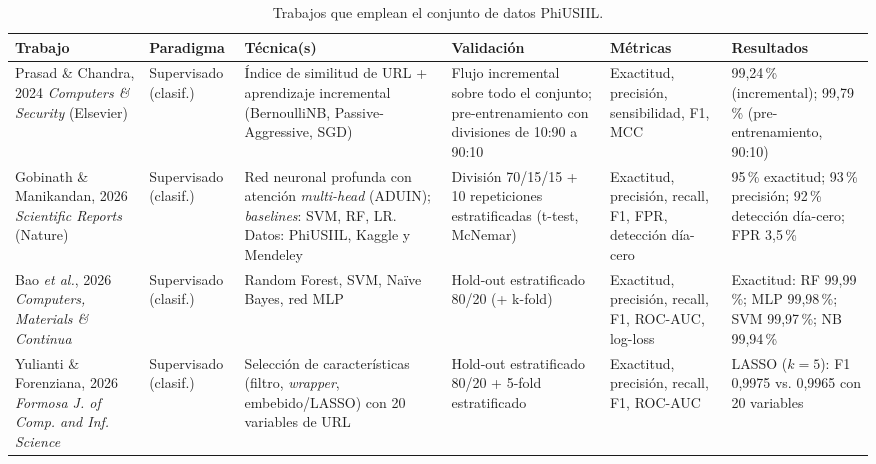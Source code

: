 \documentclass[journal]{IEEEtran}
\begin{document}
\begin{table}[t]
\centering
\caption{Trabajos que emplean el conjunto de datos PhiUSIIL.}
\label{tab:sota}
\small
\begin{tabular}{p{2.6cm} p{1.6cm} p{3.0cm} p{2.6cm} p{2.4cm} p{2.6cm}}
\toprule
\textbf{Trabajo} & \textbf{Paradigma} & \textbf{Técnica(s)} & \textbf{Validación} & \textbf{Métricas} & \textbf{Resultados} \\
\midrule
Prasad \& Chandra, 2024 \cite{prasad2024} \newline \textit{Computers \& Security} (Elsevier) &
Supervisado (clasif.) &
Índice de similitud de URL + aprendizaje incremental (BernoulliNB, Passive-Aggressive, SGD) &
Flujo incremental sobre todo el conjunto; pre-entrenamiento con divisiones de 10:90 a 90:10 &
Exactitud, precisión, sensibilidad, F1, MCC &
99,24\,\% (incremental); 99,79\,\% (pre-entrenamiento, 90:10) \\
\addlinespace
Gobinath \& Manikandan, 2026 \cite{gobinath2026} \newline \textit{Scientific Reports} (Nature) &
Supervisado (clasif.) &
Red neuronal profunda con atención \textit{multi-head} (ADUIN); \textit{baselines}: SVM, RF, LR. Datos: PhiUSIIL, Kaggle y Mendeley &
División 70/15/15 + 10 repeticiones estratificadas (t-test, McNemar) &
Exactitud, precisión, recall, F1, FPR, detección día-cero &
95\,\% exactitud; 93\,\% precisión; 92\,\% detección día-cero; FPR 3,5\,\% \\
\addlinespace
Bao \textit{et al.}, 2026 \cite{bao2026} \newline \textit{Computers, Materials \& Continua} &
Supervisado (clasif.) &
Random Forest, SVM, Naïve Bayes, red MLP &
Hold-out estratificado 80/20 (+ k-fold) &
Exactitud, precisión, recall, F1, ROC-AUC, log-loss &
Exactitud: RF 99,99\,\%; MLP 99,98\,\%; SVM 99,97\,\%; NB 99,94\,\% \\
\addlinespace
Yulianti \& Forenziana, 2026 \cite{yulianti2026} \newline \textit{Formosa J. of Comp. and Inf. Science} &
Supervisado (clasif.) &
Selección de características (filtro, \textit{wrapper}, embebido/LASSO) con 20 variables de URL &
Hold-out estratificado 80/20 + 5-fold estratificado &
Exactitud, precisión, recall, F1, ROC-AUC &
LASSO ($k{=}5$): F1 0,9975 vs. 0,9965 con 20 variables \\
\bottomrule
\end{tabular}
\end{table}
\end{document}
